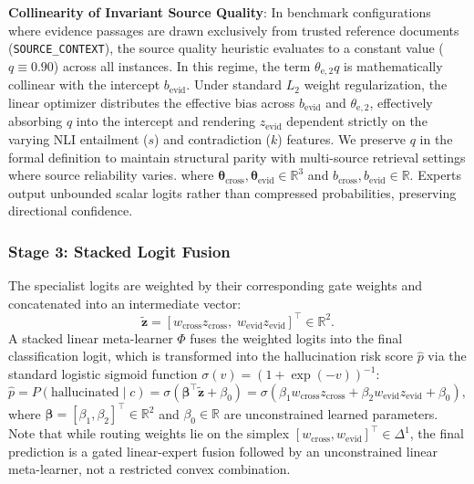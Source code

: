 \documentclass[pdflatex,sn-mathphys,Numbered]{sn-jnl}
\begin{document}
\noindent \textbf{Collinearity of Invariant Source Quality}: In benchmark configurations where evidence passages are drawn exclusively from trusted reference documents (\texttt{SOURCE\_CONTEXT}), the source quality heuristic evaluates to a constant value ($q \equiv 0.90$) across all instances. In this regime, the term $\theta_{\mathrm{e},2} q$ is mathematically collinear with the intercept $b_{\mathrm{evid}}$. Under standard $L_2$ weight regularization, the linear optimizer distributes the effective bias across $b_{\mathrm{evid}}$ and $\theta_{\mathrm{e},2}$, effectively absorbing $q$ into the intercept and rendering $z_{\mathrm{evid}}$ dependent strictly on the varying NLI entailment ($s$) and contradiction ($k$) features. We preserve $q$ in the formal definition to maintain structural parity with multi-source retrieval settings where source reliability varies.
where $\boldsymbol{\theta}_{\mathrm{cross}}, \boldsymbol{\theta}_{\mathrm{evid}} \in \mathbb{R}^3$ and $b_{\mathrm{cross}}, b_{\mathrm{evid}} \in \mathbb{R}$. Experts output unbounded scalar logits rather than compressed probabilities, preserving directional confidence.

\subsubsection{Stage 3: Stacked Logit Fusion}
The specialist logits are weighted by their corresponding gate weights and concatenated into an intermediate vector:
\begin{equation}
\tilde{\mathbf{z}} = [w_{\mathrm{cross}} z_{\mathrm{cross}}, \; w_{\mathrm{evid}} z_{\mathrm{evid}}]^{\top} \in \mathbb{R}^2.
\end{equation}
A stacked linear meta-learner $\Phi$ fuses the weighted logits into the final classification logit, which is transformed into the hallucination risk score $\hat{p}$ via the standard logistic sigmoid function $\sigma(v) = (1 + \exp(-v))^{-1}$:
\begin{equation}
\hat{p} = P(\text{hallucinated} \mid c) = \sigma\left(\boldsymbol{\beta}^{\top} \tilde{\mathbf{z}} + \beta_0\right) = \sigma\left(\beta_1 w_{\mathrm{cross}} z_{\mathrm{cross}} + \beta_2 w_{\mathrm{evid}} z_{\mathrm{evid}} + \beta_0\right),
\end{equation}
where $\boldsymbol{\beta} = [\beta_1, \beta_2]^{\top} \in \mathbb{R}^2$ and $\beta_0 \in \mathbb{R}$ are unconstrained learned parameters. Note that while routing weights lie on the simplex $[w_{\mathrm{cross}}, w_{\mathrm{evid}}]^{\top} \in \Delta^1$, the final prediction is a gated linear-expert fusion followed by an unconstrained linear meta-learner, not a restricted convex combination.
\end{document}
